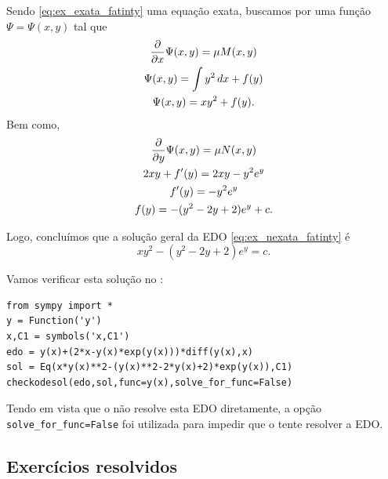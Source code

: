 \begin{ex}
  Sendo \eqref{eq:ex_exata_fatinty} uma equação exata, buscamos por uma função $\Psi = \Psi(x,y)$ tal que
  \begin{gather}
    \frac{\partial}{\partial x}\Psi(x,y) = \mu M(x,y) \\
    \Psi(x,y) = \int y^2\,dx + f(y) \\
    \Psi(x,y) = xy^2 + f(y).
  \end{gather}
  Bem como,
  \begin{gather}
    \frac{\partial}{\partial y}\Psi(x,y) = \mu N(x,y) \\
    2xy + f'(y) = 2xy - y^2e^{y} \\
    f'(y) = -y^2e^{y} \\
    f(y) = -(y^2-2y+2)e^y + c.
  \end{gather}

  Logo, concluímos que a solução geral da EDO \eqref{eq:ex_nexata_fatinty} é
  \begin{equation}
    xy^2 - (y^2-2y+2)e^y = c.
  \end{equation}

  \ifispython
  Vamos verificar esta solução no \python:
\begin{verbatim}
from sympy import *
y = Function('y')
x,C1 = symbols('x,C1')
edo = y(x)+(2*x-y(x)*exp(y(x)))*diff(y(x),x)
sol = Eq(x*y(x)**2-(y(x)**2-2*y(x)+2)*exp(y(x)),C1)
checkodesol(edo,sol,func=y(x),solve_for_func=False)
\end{verbatim}
  Tendo em vista que o \sympy\;não resolve esta EDO diretamente, a opção \verb+solve_for_func=False+ foi utilizada para impedir que o \sympy\;tente resolver a EDO.
  \fi
\end{ex}

\subsection*{Exercícios resolvidos}

